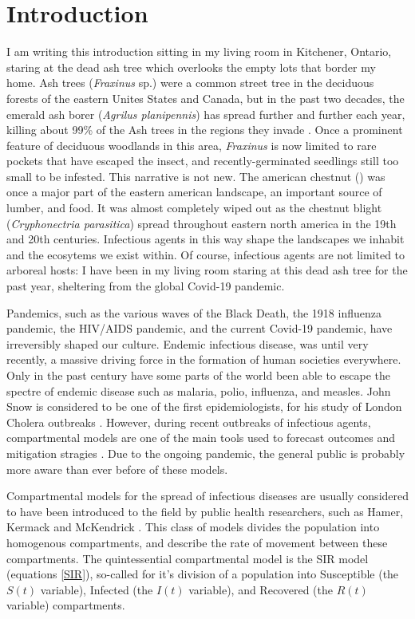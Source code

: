 \chapter{Introduction}

I am writing this introduction sitting in my living room in Kitchener, Ontario, staring at the dead ash tree which overlooks the empty lots that border my home. Ash trees (\textit{Fraxinus} sp.) were a common street tree in the deciduous forests of the eastern Unites States and Canada, but in the past two decades, the emerald ash borer (\textit{Agrilus planipennis}) has spread further and further each year, killing about 99\% of the Ash trees in the regions they invade \cite{nrcaneab}. Once a prominent feature of deciduous woodlands in this area, \textit{Fraxinus} is now limited to rare pockets that have escaped the insect, and recently-germinated seedlings still too small to be infested. This narrative is not new. The american chestnut () was once a major part of the eastern american landscape, an important source of lumber, and food. It was almost completely wiped out as the chestnut blight (\textit{Cryphonectria parasitica}) spread throughout eastern north america in the 19th and 20th centuries. Infectious agents in this way shape the landscapes we inhabit and the ecosytems we exist within. Of course, infectious agents are not limited to arboreal hosts: I have been in my living room staring at this dead ash tree for the past year, sheltering from the global Covid-19 pandemic. 

Pandemics, such as the various waves of the Black Death, the 1918 influenza pandemic, the HIV/AIDS pandemic, and the current Covid-19 pandemic, have irreversibly shaped our culture. Endemic infectious disease, was until very recently, a massive driving force in the formation of human societies everywhere. Only in the past century have some parts of the world been able to escape the spectre of endemic disease such as malaria, polio, influenza, and measles. John Snow is considered to be one of the first epidemiologists, for his study of London Cholera outbreaks \cite{snow1855mode, brauer2019mathematical}. However, during recent outbreaks of infectious agents, compartmental models are one of the main tools used to forecast outcomes and mitigation stragies \cite{brauer2008compartmental}. Due to the ongoing pandemic, the general public is probably more aware than ever before of these models.

Compartmental models for the spread of infectious diseases are usually considered to have been introduced to the field by public health researchers, such as Hamer, Kermack and McKendrick \cite{hamer1906epidemic, kermack1927contribution, brauer2019mathematical,edelstein2005mathematical}. This class of models divides the population into homogenous compartments, and describe the rate of movement between these compartments. The quintessential compartmental model is the SIR model (equations \ref{SIR}), so-called for it's division of a population into Susceptible (the $S(t)$ variable), Infected (the $I(t)$ variable), and Recovered (the $R(t)$ variable) compartments.

